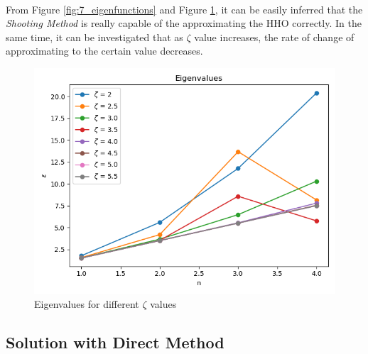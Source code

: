 \documentclass[letterpaper,12pt]{article}
\begin{document}
\paragraph{} From Figure \ref{fig:7_eigenfunctions} and Figure \ref{fig:7_eigenvalue}, it can be easily inferred that the \textit{Shooting Method} is really capable of the approximating the HHO correctly. In the same time, it can be investigated that as $\zeta$ value increases, the rate of change of approximating to the certain value decreases.
\begin{figure}[H]
\centerline{\includegraphics[width=\linewidth]{figures/7_eigenvalue.png}}
\caption{Eigenvalues for different $\zeta$ values}
\label{fig:7_eigenvalue}
\end{figure}

\subsection{Solution with Direct Method}
\end{document}
